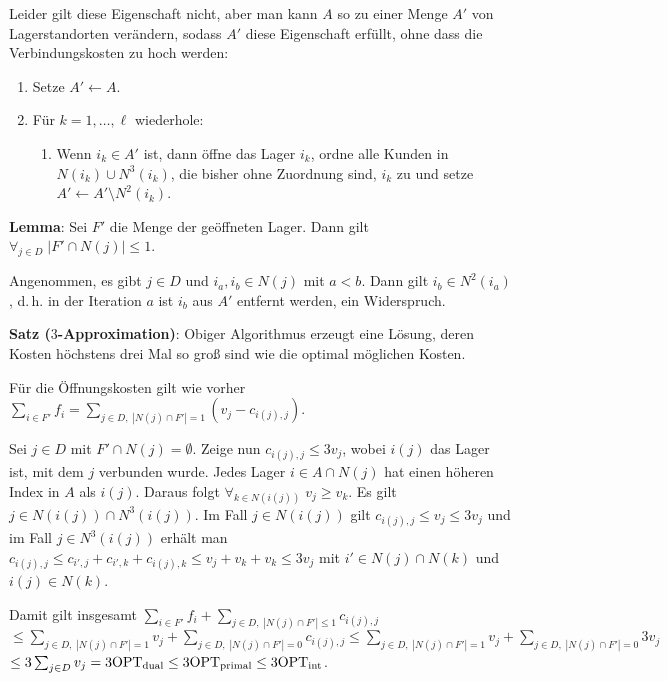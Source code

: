 Leider gilt diese Eigenschaft nicht,
aber man kann $A$ so zu einer Menge $A'$ von Lagerstandorten verändern,
sodass $A'$ diese Eigenschaft erfüllt, ohne dass die Verbindungskosten zu hoch werden:
\begin{enumerate}[start=3]
    \item
    Setze $A' \leftarrow A$.
    
    \item
    Für $k = 1, \dotsc, \ell$ wiederhole:
    \begin{enumerate}
        \item
        Wenn $i_k \in A'$ ist,
        dann öffne das Lager $i_k$,
        ordne alle Kunden in $N(i_k) \cup N^3(i_k)$, die bisher ohne Zuordnung sind, $i_k$ zu
        und setze $A' \leftarrow A' \setminus N^2(i_k)$.
    \end{enumerate}
\end{enumerate}

\linie

\textbf{Lemma}:
Sei $F'$ die Menge der geöffneten Lager.
Dann gilt $\forall_{j \in D}\; |F' \cap N(j)| \le 1$.

\begin{Beweis}
    Angenommen, es gibt $j \in D$ und $i_a, i_b \in N(j)$ mit $a < b$.
    Dann gilt $i_b \in N^2(i_a)$, d.\,h. in der Iteration $a$ ist $i_b$ aus $A'$
    entfernt werden, ein Widerspruch.
\end{Beweis}

\textbf{Satz ($3$-Approximation)}:
Obiger Algorithmus erzeugt eine Lösung, deren Kosten höchstens drei Mal so groß sind
wie die optimal möglichen Kosten.

\begin{Beweis}
    Für die Öffnungskosten gilt wie vorher
    $\sum_{i \in F'} f_i
    = \sum_{j \in D,\; |N(j) \cap F'| = 1} (v_j - c_{i(j),j})$.
    
    Sei $j \in D$ mit $F' \cap N(j) = \emptyset$.
    Zeige nun $c_{i(j),j} \le 3v_j$,
    wobei $i(j)$ das Lager ist, mit dem $j$ verbunden wurde.
    Jedes Lager $i \in A \cap N(j)$ hat einen höheren Index in $A$ als $i(j)$.
    Daraus folgt $\forall_{k \in N(i(j))}\; v_j \ge v_k$.
    Es gilt $j \in N(i(j)) \cap N^3(i(j))$.
    Im Fall $j \in N(i(j))$ gilt $c_{i(j),j} \le v_j \le 3v_j$ und im Fall
    $j \in N^3(i(j))$ erhält man
    $c_{i(j),j} \le c_{i',j} + c_{i',k} + c_{i(j),k} \le v_j + v_k + v_k \le 3v_j$
    mit $i' \in N(j) \cap N(k)$ und $i(j) \in N(k)$.
    
    Damit gilt insgesamt
    $\sum_{i \in F'} f_i + \sum_{j \in D,\; |N(j) \cap F'| \le 1} c_{i(j),j}$\\
    $\le \sum_{j \in D,\; |N(j) \cap F'| = 1} v_j
    + \sum_{j \in D,\; |N(j) \cap F'| = 0} c_{i(j),j}
    \le \sum_{j \in D,\; |N(j) \cap F'| = 1} v_j
    + \sum_{j \in D,\; |N(j) \cap F'| = 0} 3v_j$\\
    $\le 3\sum_{j \in D} v_j
    = 3\text{OPT}_\text{dual} \le 3\text{OPT}_\text{primal} \le 3\text{OPT}_\text{int}$.
\end{Beweis}

\pagebreak
